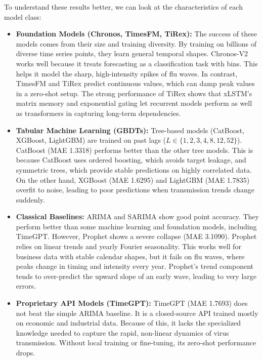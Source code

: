 To understand these results better, we can look at the characteristics of each model class:
\begin{itemize}
    \item \textbf{Foundation Models (Chronos, TimesFM, TiRex):} The success of these models comes from their size and training diversity. By training on billions of diverse time series points, they learn general temporal shapes. Chronos-V2 works well because it treats forecasting as a classification task with bins. This helps it model the sharp, high-intensity spikes of flu waves. In contrast, TimesFM and TiRex predict continuous values, which can damp peak values in a zero-shot setup. The strong performance of TiRex shows that xLSTM's matrix memory and exponential gating let recurrent models perform as well as transformers in capturing long-term dependencies.
    \item \textbf{Tabular Machine Learning (GBDTs):} Tree-based models (CatBoost, XGBoost, LightGBM) are trained on past lags ($L \in \{1, 2, 3, 4, 8, 12, 52\}$). CatBoost (MAE 1.3318) performs better than the other tree models. This is because CatBoost uses ordered boosting, which avoids target leakage, and symmetric trees, which provide stable predictions on highly correlated data. On the other hand, XGBoost (MAE 1.6295) and LightGBM (MAE 1.7835) overfit to noise, leading to poor predictions when transmission trends change suddenly.
    \item \textbf{Classical Baselines:} ARIMA and SARIMA show good point accuracy. They perform better than some machine learning and foundation models, including TimeGPT. However, Prophet shows a severe collapse (MAE 3.1090). Prophet relies on linear trends and yearly Fourier seasonality. This works well for business data with stable calendar shapes, but it fails on flu waves, where peaks change in timing and intensity every year. Prophet's trend component tends to over-predict the upward slope of an early wave, leading to very large errors.
    \item \textbf{Proprietary API Models (TimeGPT):} TimeGPT (MAE 1.7693) does not beat the simple ARIMA baseline. It is a closed-source API trained mostly on economic and industrial data. Because of this, it lacks the specialized knowledge needed to capture the rapid, non-linear dynamics of virus transmission. Without local training or fine-tuning, its zero-shot performance drops.
\end{itemize}

